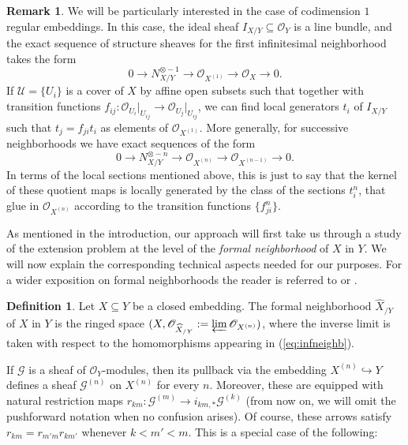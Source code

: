 \documentclass[reqno]{amsart}
\theoremstyle{plain}
\newcommand{\OO}{\mathcal{O}}
\newcommand{\U}{\mathcal{U}}
\theoremstyle{definition}
\newtheorem{definition}[theorem]{Definition}
\newtheorem{remark}[theorem]{Remark}
\theoremstyle{named}
\begin{document}
\begin{remark} \label{los_t's}
    We will be particularly interested in the case of codimension $1$ regular embeddings. In this case, the ideal sheaf $I_{X/Y}\subseteq \OO_Y$ is a line bundle, and the exact sequence of structure sheaves for the first infinitesimal neighborhood takes the form
$$ 0 \rightarrow N_{X/Y}^{\otimes -1} \rightarrow \OO_{X^{(1)}}\rightarrow \OO_X \rightarrow 0.$$
If $\U = \{U_i\}$ is a cover of $X$ by affine open subsets such that \smash{$N_{X/Y}^{\otimes -1}\big|_{U_i}\simeq \OO_{U_i}$} together with transition functions $f_{ij}:\OO_{U_i}\vert_{U_{ij}}\to \OO_{U_j}\vert_{U_{ij}}$, we can find local generators $t_i$ of $I_{X/Y}$ such that $t_j=f_{ji} t_i$ as elements of $\OO_{X^{(1)}}$.
More generally, for successive neighborhoods we have exact sequences of the form
\begin{equation}\label{sucesive_thickenings}
0 \rightarrow N_{X/Y}^{\otimes - n} \rightarrow \OO_{X^{(n)}}\rightarrow \OO_{X^{(n-1)}}\rightarrow 0. 
\end{equation}
In terms of the local sections mentioned above, this is just to say that the kernel of these quotient maps is locally generated by the class of the sections $t_i^n$, that glue in $\OO_{X^{(n)}}$ according to the transition functions $\{f_{ji}^n\}$. 
\end{remark}

As mentioned in the introduction, our approach will first take us through a study of the extension problem at the level of the \emph{formal neighborhood} of $X$ in $Y$. We will now explain the corresponding technical aspects needed for our purposes. For a wider exposition on formal neighborhoods the reader is referred to \cite[Section II.9]{hartshorne} or \cite[Section 10.8]{EGAI}.

\begin{definition} Let $X\subseteq Y$ be a closed embedding. The formal neighborhood $\widehat{X}_{/Y}$ of $X$ in $Y$ is the ringed space $(X,\OO_{\widehat{X}_{/Y}}:=\varprojlim \OO_{X^{(n)}})$, where the inverse limit is taken with respect to the homomorphisms appearing in (\ref{eq:infneighb}).
\end{definition}

If $\mathcal{G}$ is a sheaf of $\OO_Y$-modules, then its pullback via the embedding $X^{(n)}\hookrightarrow Y$ defines a sheaf $\mathcal{G}^{(n)}$ on $X^{(n)}$ for every $n$. Moreover, these are equipped with natural restriction maps $r_{km}:\mathcal{G}^{(m)}\to i_{km,*}\mathcal{G}^{(k)}$ (from now on, we will omit the pushforward notation when no confusion arises). Of course, these arrows satisfy $r_{km}=r_{m'm}r_{km'}$ whenever $k<m'<m$. This is a special case of the following:
\end{document}
